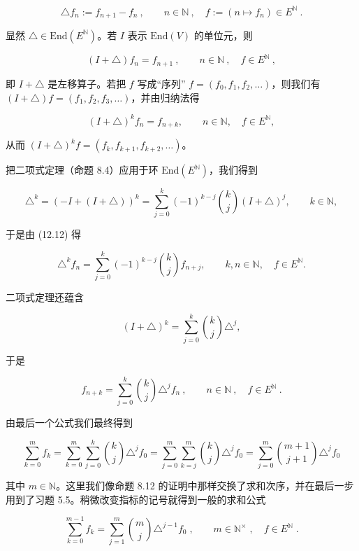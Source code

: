 \[
\triangle f_{n}:=f_{n+1}-f_{n}~,\qquad n\in\mathbb{N}~,\quad f:=(n\mapsto f_{n})\in E^{\mathbb{N}}~.
\]

显然  $ \triangle \in \mathrm{End}(E^{\mathbb{N}}) $。若  $ I $ 表示  $ \mathrm{End}(V) $ 的单位元，则

\[
(I+\triangle)f_{n}=f_{n+1}~,\qquad n\in\mathbb{N}~,\quad f\in E^{\mathbb{N}}~,
\]

即  $ I + \triangle $ 是左移算子。若把  $ f $ 写成“序列” $ f = (f_0, f_1, f_2, \ldots) $，则我们有  $ (I + \triangle)f = (f_1, f_2, f_3, \ldots) $，并由归纳法得

\begin{equation}
(I+\triangle)^{k}f_{n}=f_{n+k},\qquad n\in\mathbb{N},\quad f\in E^{\mathbb{N}},
\end{equation}

从而  $ (I + \triangle)^{k} f = (f_{k}, f_{k+1}, f_{k+2}, \ldots) $。

把二项式定理（命题 8.4）应用于环  $ \mathrm{End}(E^{\mathbb{N}}) $，我们得到

\[
\triangle^{k}=\left(-I+(I+\triangle)\right)^{k}=\sum_{j=0}^{k}(-1)^{k-j}{k\choose j}(I+\triangle)^{j},\qquad k\in\mathbb{N},
\]

于是由 (12.12) 得

\[
\triangle^{k}f_{n}=\sum_{j=0}^{k}(-1)^{k-j}{k\choose j}f_{n+j},\qquad k,n\in\mathbb{N},\quad f\in E^{\mathbb{N}}.
\]

二项式定理还蕴含

\[
(I+\triangle)^{k}=\sum_{j=0}^{k}\binom{k}{j}\triangle^{j},
\]

于是

\begin{equation}
f_{n+k}=\sum_{j=0}^{k}\binom{k}{j}\triangle^{j} f_{n}~,\qquad n\in\mathbb{N}~,\quad f\in E^{\mathbb{N}}~.
\end{equation}

由最后一个公式我们最终得到

\[
\sum_{k=0}^{m}f_{k}=\sum_{k=0}^{m}\sum_{j=0}^{k}\binom{k}{j}\triangle^{j}f_{0}=\sum_{j=0}^{m}\sum_{k=j}^{m}\binom{k}{j}\triangle^{j}f_{0}=\sum_{j=0}^{m}\binom{m+1}{j+1}\triangle^{j}f_{0}
\]

其中 $ m \in \mathbb{N} $。这里我们像命题 8.12 的证明中那样交换了求和次序，并在最后一步用到了习题 5.5。稍微改变指标的记号就得到一般的求和公式

\begin{equation}
\sum_{k=0}^{m-1}f_{k}=\sum_{j=1}^{m}\binom{m}{j}\triangle^{j-1}f_{0}\;,\qquad m\in\mathbb{N}^{\times}\;,\quad f\in E^{\mathbb{N}}\;.
\end{equation}

